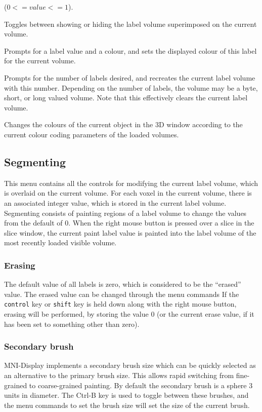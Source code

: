 \documentclass[11pt,letterpaper]{article}
\newcommand{\ident}[1]{{\tt #1}}
\newcommand{\display}{\mbox{MNI-Display}}
\newcommand{\menutwo}[2]{{\scriptsize \fbox{\bf #1}/\fbox{\bf #2}}}
\begin{document}
\begin{description}
  ($0 <= value <= 1$).
\item[\menutwo{Colour Coding}{Show Labels}]  Toggles between showing
  or hiding the label volume superimposed on the current
  volume.
\item[\menutwo{Colour Coding}{Set Paint Lbl Colour}]  Prompts for a
  label value and a colour, and sets the displayed
  colour of this label for the current volume.
\item[\menutwo{Colour Coding}{Num Labels}] Prompts for the number of
  labels desired, and recreates the current label volume with this
  number.  Depending on the number of labels, the volume may be a
  byte, short, or long valued volume.  Note that this effectively
  clears the current label volume.
\item[\menutwo{Colour Coding}{Colour Code Objects}]  Changes the
  colours of the current object in the 3D window according to the current
  colour coding parameters of the loaded volumes.
\end{description}

\subsection{Segmenting}

This menu contains all the controls for modifying the current label
volume, which is overlaid on the current volume. For each voxel in the
current volume, there is an associated integer value, which is stored in
the current label volume. Segmenting consists of painting regions of a
label volume to change the values from the default of 0.  When the right
mouse button is pressed over a slice in the slice window, the current
paint label value is painted into the label volume of the most recently
loaded visible volume.  

\subsubsection{Erasing}

The default value of all labels is zero, which is considered to be the
``erased'' value. The erased value can be changed through the menu
commands If the \ident{control} key or \ident{shift}
key is held down along with the right mouse button, erasing will be
performed, by storing the value 0 (or the current erase value, if it has
been set to something other than zero).

\subsubsection{Secondary brush}
\display{} implements a secondary brush size which can be quickly
selected as an alternative to the primary brush size. This allows rapid
switching from fine-grained to coarse-grained painting. By default the
secondary brush is a sphere 3 units in diameter. The Ctrl-B key
is used to toggle between these brushes, and the menu commands to set
the brush size will set the size of the current brush.
\end{document}
